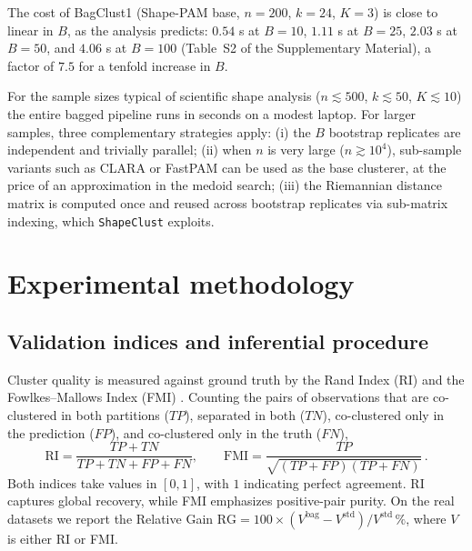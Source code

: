 \documentclass[review,11pt,3p,authoryear]{elsarticle}
\newcommand{\rmFMI}{\mathrm{FMI}}
\newcommand{\rmRI}{\mathrm{RI}}
\newcommand{\rmRG}{\mathrm{RG}}
\newcommand{\ShapeClust}{\texttt{ShapeClust}}
\begin{document}
The cost of BagClust1 (Shape-PAM base, $n=200$, $k=24$, $K=3$) is close
to linear in $B$, as the analysis predicts: $0.54$ s at $B=10$, $1.11$ s
at $B=25$, $2.03$ s at $B=50$, and $4.06$ s at $B=100$ (Table~S2 of the
Supplementary Material), a factor of $7.5$ for a tenfold increase in
$B$.

For the sample sizes typical of scientific shape analysis
($n\lesssim 500$, $k\lesssim 50$, $K\lesssim 10$) the entire bagged
pipeline runs in seconds on a modest laptop. For larger samples,
three complementary strategies apply: (i) the $B$ bootstrap replicates
are independent and trivially parallel; (ii) when $n$ is very large
($n\gtrsim 10^4$), sub-sample variants such as CLARA
\citep{ng2002clarans} or FastPAM
\citep{schubert2019faster,schubert2021fast} can be used as the base
clusterer, at the price of an approximation in the medoid search;
(iii) the Riemannian distance matrix is computed once and reused
across bootstrap replicates via sub-matrix indexing, which
\ShapeClust{} exploits.


\section{Experimental methodology}
\label{sec:experiments}

\subsection{Validation indices and inferential procedure}

Cluster quality is measured against ground truth by the Rand Index
(RI) \citep{rand1971objective} and the Fowlkes--Mallows Index (FMI)
\citep{fowlkes1983method,hubert1985comparing}. Counting the pairs of
observations that are co-clustered in both partitions ($TP$),
separated in both ($TN$), co-clustered only in the prediction ($FP$),
and co-clustered only in the truth ($FN$),
\begin{equation}
  \label{eq:ri-fmi}
  \rmRI = \frac{TP+TN}{TP+TN+FP+FN}, \qquad
  \rmFMI = \frac{TP}{\sqrt{(TP+FP)(TP+FN)}}\,.
\end{equation}
Both indices take values in $[0,1]$, with $1$ indicating perfect
agreement. RI captures global recovery, while FMI emphasizes
positive-pair purity. On the real datasets we report the Relative Gain
$\rmRG = 100\times(V^{\text{bag}}-V^{\text{std}})/V^{\text{std}}\,\%$,
where $V$ is either RI or FMI.
\end{document}
